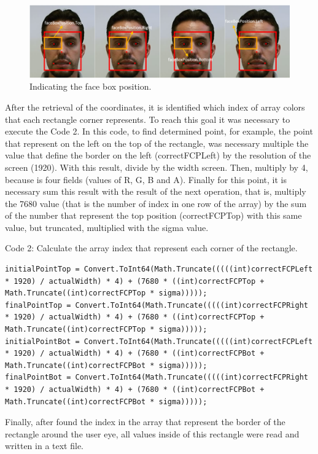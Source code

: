 \documentclass[10pt, conference]{IEEEtran}
\begin{document}
  \begin{figure}[t]
      \centering
      \includegraphics{figures/pic12.png}
      \caption{Indicating the face box position.}
      \label{fig:fig12}
  \end{figure}

	After the retrieval of the coordinates, it is identified which index of array colors that each rectangle corner represents.
	To reach this goal it was necessary to execute the Code 2. 
	In this code, to find determined point, for example, the point that represent on the left on the top of the rectangle, was necessary multiple the value that define the border on the left (correctFCPLeft) by the resolution of the screen (1920). 
	With this result, divide by the width screen. Then, multiply by 4, because is four fields (values of R, G, B and A). 
	Finally for this point, it is necessary sum this result with the result of the next operation, that is, multiply the 7680 value (that is the number of index in one row of the array) by the sum of the number that represent the top position (correctFCPTop) with this same value, but truncated, multiplied with the sigma value.

Code 2: Calculate the array index that represent each corner of the rectangle.
\begin{lstlisting}
initialPointTop = Convert.ToInt64(Math.Truncate(((((int)correctFCPLeft * 1920) / actualWidth) * 4) + (7680 * ((int)correctFCPTop + Math.Truncate((int)correctFCPTop * sigma)))));
finalPointTop = Convert.ToInt64(Math.Truncate(((((int)correctFCPRight * 1920) / actualWidth) * 4) + (7680 * ((int)correctFCPTop + Math.Truncate((int)correctFCPTop * sigma)))));
initialPointBot = Convert.ToInt64(Math.Truncate(((((int)correctFCPLeft * 1920) / actualWidth) * 4) + (7680 * ((int)correctFCPBot + Math.Truncate((int)correctFCPBot * sigma)))));
finalPointBot = Convert.ToInt64(Math.Truncate(((((int)correctFCPRight * 1920) / actualWidth) * 4) + (7680 * ((int)correctFCPBot + Math.Truncate((int)correctFCPBot * sigma)))));
\end{lstlisting}


	Finally, after found the index in the array that represent the border of the rectangle around the user eye, all values inside of this rectangle were read and written in a text file. 
\end{document}
